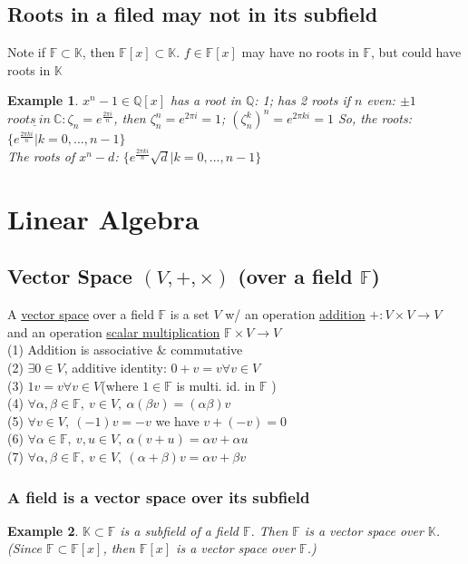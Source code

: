\documentclass[11pt,a4paper]{article}
\newtheorem{example}{Example}
\begin{document}
\subsection{Roots in a filed may not in its subfield}
Note if $\mathbb{F}\subset \mathbb{K}$, then $\mathbb{F}[x]\subset\mathbb{K}$. $f\in\mathbb{F}[x]$ may have no roots in $\mathbb{F}$, but could have roots in $\mathbb{K}$
\begin{example}
    $x^n-1\in\mathbb{Q}[x]$ has a root in $\mathbb{Q}$: 1; has 2 roots if $n$ even: $\pm 1$\\
    $\underline{roots\ in\ \mathbb{C}}:\zeta_n=e^{\frac{2\pi i}{n}}$, then $\zeta_n^n=e^{2\pi i}=1$; $(\zeta_n^k)^n=e^{2\pi ki}=1$ So, the roots: $\{e^{\frac{2\pi ki}{n}}|k=0,...,n-1\}$\\
    The roots of $x^n-d$: $\{e^{\frac{2\pi ki}{n}}\sqrt{d}|k=0,...,n-1\}$\\
\end{example}



\section{Linear Algebra}
\subsection{ Vector Space $(V,+,\times)$ (over a field $\mathbb{F}$)}
A \underline{vector space} over a field $\mathbb{F}$ is a
set $V$ w/ an operation \underline{addition} $+ : V \times V \rightarrow V$ and
an operation \underline{scalar multiplication} $\mathbb{F} \times V \rightarrow V$\\
(1) Addition is associative $\&$ commutative\\
(2) $\exists 0\in V$, additive identity: $0 + v = v \forall v \in V$\\
(3) $1v = v \forall v \in V$(where $1 \in \mathbb{F}$ is multi. id. in $\mathbb{F}$ )\\
(4) $\forall \alpha,\beta\in\mathbb{F},\ v\in V,\ \alpha(\beta v)=(\alpha\beta)v$\\
(5) $\forall v\in V,\ (-1)v=-v$ we have $v+(-v)=0$\\
(6) $\forall \alpha\in\mathbb{F},\ v,u\in V,\ \alpha(v+u)=\alpha v+\alpha u$\\
(7) $\forall \alpha,\beta\in\mathbb{F},\ v\in V,\ (\alpha+\beta)v=\alpha v+\beta v$

\subsubsection{A field is a vector space over its subfield}
\begin{example}
$\mathbb{K}\subset\mathbb{F}$ is a subfield of a field $\mathbb{F}$. Then $\mathbb{F}$ is a vector space over $\mathbb{K}$. (Since $\mathbb{F}\subset \mathbb{F}[x]$, then $\mathbb{F}[x]$ is a vector space over $\mathbb{F}$.)
\end{example}
\end{document}
